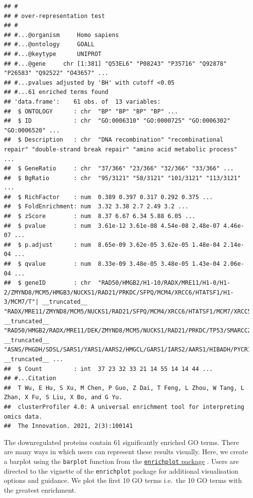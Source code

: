 \documentclass[9pt,a4paper,]{extarticle}
\begin{document}
\begin{verbatim}
## #
## # over-representation test
## #
## #...@organism     Homo sapiens 
## #...@ontology     GOALL 
## #...@keytype      UNIPROT 
## #...@gene     chr [1:381] "Q53EL6" "P08243" "P35716" "Q92878" "P26583" "Q92522" "O43657" ...
## #...pvalues adjusted by 'BH' with cutoff <0.05 
## #...61 enriched terms found
## 'data.frame':    61 obs. of  13 variables:
##  $ ONTOLOGY      : chr  "BP" "BP" "BP" "BP" ...
##  $ ID            : chr  "GO:0006310" "GO:0000725" "GO:0006302" "GO:0006520" ...
##  $ Description   : chr  "DNA recombination" "recombinational repair" "double-strand break repair" "amino acid metabolic process" ...
##  $ GeneRatio     : chr  "37/366" "23/366" "32/366" "33/366" ...
##  $ BgRatio       : chr  "95/3121" "58/3121" "101/3121" "113/3121" ...
##  $ RichFactor    : num  0.389 0.397 0.317 0.292 0.375 ...
##  $ FoldEnrichment: num  3.32 3.38 2.7 2.49 3.2 ...
##  $ zScore        : num  8.37 6.67 6.34 5.88 6.05 ...
##  $ pvalue        : num  3.61e-12 3.61e-08 4.54e-08 2.48e-07 4.46e-07 ...
##  $ p.adjust      : num  8.65e-09 3.62e-05 3.62e-05 1.48e-04 2.14e-04 ...
##  $ qvalue        : num  8.33e-09 3.48e-05 3.48e-05 1.43e-04 2.06e-04 ...
##  $ geneID        : chr  "RAD50/HMGB2/H1-10/RADX/MRE11/H1-0/H1-2/ZMYND8/MCM5/HMGB3/NUCKS1/RAD21/PRKDC/SFPQ/MCM4/XRCC6/HTATSF1/H1-3/MCM7/T"| __truncated__ "RADX/MRE11/ZMYND8/MCM5/NUCKS1/RAD21/SFPQ/MCM4/XRCC6/HTATSF1/MCM7/XRCC5/PPP4R2/POGZ/YY1/MCM3/MCM2/VPS72/PARP1/BR"| __truncated__ "RAD50/HMGB2/RADX/MRE11/DEK/ZMYND8/MCM5/NUCKS1/RAD21/PRKDC/TP53/SMARCC2/SFPQ/MCM4/XRCC6/HPF1/HTATSF1/MCM7/XRCC5/"| __truncated__ "ASNS/PHGDH/SDSL/SARS1/YARS1/AARS2/HMGCL/GARS1/IARS2/AARS1/HIBADH/PYCR1/ACADSB/DHFR/MCCC2/SLC25A12/MARS1/PSAT1/S"| __truncated__ ...
##  $ Count         : int  37 23 32 33 21 14 55 14 14 44 ...
## #...Citation
##  T Wu, E Hu, S Xu, M Chen, P Guo, Z Dai, T Feng, L Zhou, W Tang, L Zhan, X Fu, S Liu, X Bo, and G Yu.
##  clusterProfiler 4.0: A universal enrichment tool for interpreting omics data.
##  The Innovation. 2021, 2(3):100141
\end{verbatim}

The downregulated proteins contain 61 significantly enriched GO
terms. There are many ways in which users can represent these results visually.
Here, we create a barplot using the \texttt{barplot} function from the \href{https://bioconductor.org/packages/release/bioc/html/enrichplot.html}{\texttt{enrichplot} package}
\citep{enrichplot}. Users are directed to the vignette of the \texttt{enrichplot} package
for additional visualisation options and guidance. We plot the first 10 GO terms
i.e.~the 10 GO terms with the greatest enrichment.
\end{document}
